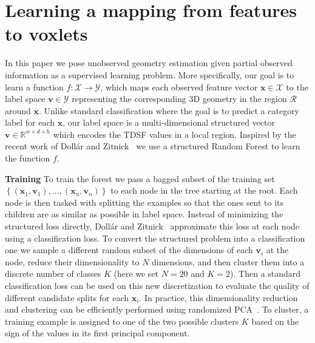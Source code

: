 \documentclass[10pt,twocolumn,letterpaper]{article}
\renewcommand{\paragraph}{\vspace{2pt}\noindent\textbf}
\begin{document}
\section{Learning a mapping from features to voxlets}
\label{sec:forest_train}
In this paper we pose unobserved geometry estimation given partial observed information as a supervised learning problem. 
More specifically, our goal is to learn a function $f: \mathcal{X}\to \mathcal{Y}$, which maps each observed feature vector $\mathbf{x} \in \mathcal{X}$ to the label space $\mathbf{v} \in \mathcal{Y}$ representing the corresponding 3D geometry in the region $\mathcal{R}$ around $\mathbf{x}$. 
Unlike standard classification where the goal is to predict a category label for each $\mathbf{x}$, our label space is a multi-dimensional structured vector $\mathbf{v} \in \mathbb{R}^{w\times{}d\times{}h}$ which encodes the TDSF values in a local region. 
Inspired by the recent work of Doll{\'a}r and Zitnick~\cite{dollar-iccv-2013} we use a structured Random Forest to learn the function $f$. 

\paragraph{Training} 
To train the forest we pass a bagged subset of the training set $\left\{(\mathbf{x}_1, \mathbf{v}_1), ..., (\mathbf{x}_n, \mathbf{v}_n)\right\}$ to each node in the tree starting at the root. 
Each node is then tasked with splitting the examples so that the ones sent to its children are as similar as possible in label space. 
Instead of minimizing the structured loss directly, Doll{\'a}r and Zitnick~\cite{dollar-iccv-2013} approximate this loss at each node using a classification loss.
To convert the structured problem into a classification one we sample a different random subset of the dimensions of each $\mathbf{v}_i$ at the node, reduce their dimensionality to $N$ dimensions, and then cluster them into a discrete number of classes $K$ (here we set $N=20$ and $K=2$).
Then a standard classification loss can be used on this new discretization to evaluate the quality of different candidate splits for each $\mathbf{x}_i$. 
In practice, this dimensionality reduction and clustering can be efficiently performed using randomized PCA~\cite{halko-siam-2011}.
To cluster, a training example is assigned to one of the two possible clusters $K$ based on the sign of the values in its first principal component. 
\end{document}
